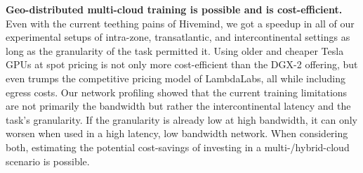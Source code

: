 \textbf{Geo-distributed multi-cloud training is possible and is cost-efficient.}
Even with the current teething pains of Hivemind, we got a speedup in all of our experimental setups of intra-zone, transatlantic, and intercontinental settings as long as the granularity of the task permitted it.
Using older and cheaper Tesla GPUs at spot pricing is not only more cost-efficient than the DGX-2 offering, but even trumps the competitive pricing model of LambdaLabs, all while including egress costs.
Our network profiling showed that the current training limitations are not primarily the bandwidth but rather the intercontinental latency and the task's granularity.
If the granularity is already low at high bandwidth, it can only worsen when used in a high latency, low bandwidth network.
When considering both, estimating the potential cost-savings of investing in a multi-/hybrid-cloud scenario is possible.





















